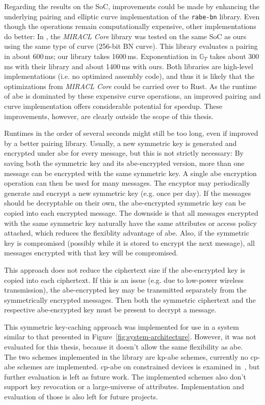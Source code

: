 Regarding the results on the SoC, improvements could be made by enhancing the underlying pairing and elliptic curve implementation of the \texttt{rabe-bn} library.
Even though the operations remain computationally expensive, other implementations do better:
In \cite{scott_deployment_2020}, the \emph{MIRACL Core} library was tested on the same SoC as ours using the same type of curve (256-bit BN curve).
This library evaluates a pairing in about 600\,ms; our library takes 1600\,ms. 
Exponentiation in $\mathbb{G}_T$ takes about 300\,ms with their library and about 1400\,ms with ours. 
Both libraries are high-level implementations (i.e. no optimized assembly code), and thus it is likely that the optimizations from \emph{MIRACL Core} could be carried over to Rust.
As the runtime of \acrshort{abe} is dominated by these expensive curve operations, an improved pairing and curve implementation offers considerable potential for speedup.
These improvements, however, are clearly outside the scope of this thesis.

Runtimes in the order of several seconds might still be too long, even if improved by a better pairing library.
Usually, a new symmetric key is generated and encrypted under \acrshort{abe} for every message, but this is not strictly necessary:
By saving both the symmetric key and its \acrshort{abe}-encrypted version, more than one message can be encrypted with the same symmetric key.
A single \acrshort{abe} encryption operation can then be used for many messages.
The encyptor may periodically generate and encrypt a new symmetric key (e.g. once per day).
If the messages should be decryptable on their own, the \acrshort{abe}-encrypted symmetric key can be copied into each encrypted message.
The downside is that all messages encrypted with the same symmetric key naturally have the same attributes or access policy attached, which reduces the flexiblity advantage of \acrshort{abe}.
Also, if the symmetric key is compromised (possibly while it is stored to encrypt the next message), all messages encrypted with that key will be compromised.

This approach does not reduce the ciphertext size if the \acrshort{abe}-encrypted key is copied into each ciphertext.
If this is an issue (e.g. due to low-power wireless transmission), the \acrshort{abe}-encrypted key may be transmitted separately from the symmetrically encrypted messages.
Then both the symmetric ciphertext and the respective \acrshort{abe}-encrypted key must be present to decrypt a message.

This symmetric key-caching approach was implemented for use in a system similar to that presented in Figure~\ref{fig:system-architecture}.
However, it was not evaluated for this thesis, because it doesn't allow the same flexibility as \acrlong{abe}.
~\\

The two schemes implemented in the library are \acrshort{kp-abe} schemes, currently no \acrshort{cp-abe} schemes are implemented.
\acrshort{cp-abe} on constrained devices is examined in~\cite{borgh_attribute-based_2016}, but further evaluation is left as future work.
The implemented schemes also don't support key revocation or a \gls{large-universe} of attributes. 
Implementation and evaluation of those is also left for future projects.
